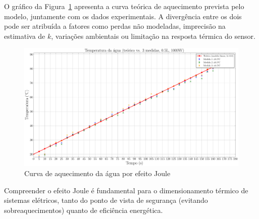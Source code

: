 \documentclass[conference]{IEEEtran}
\begin{document}
O gráfico da Figura~\ref{fig:plot_temperatura} apresenta a curva teórica de aquecimento prevista pelo modelo, juntamente com os dados experimentais. A divergência entre os dois pode ser atribuída a fatores como perdas não modeladas, imprecisão na estimativa de $k$, variações ambientais ou limitação na resposta térmica do sensor.

\begin{figure}[htbp]
    \centering
    \caption{Curva de aquecimento da água por efeito Joule}
    \label{fig:plot_temperatura}
    \includegraphics[width=0.8\linewidth]{figures/plot_temperatura.pdf}
\end{figure}

Compreender o efeito Joule é fundamental para o dimensionamento térmico de sistemas elétricos, tanto do ponto de vista de segurança (evitando sobreaquecimentos) quanto de eficiência energética.




\end{document}
